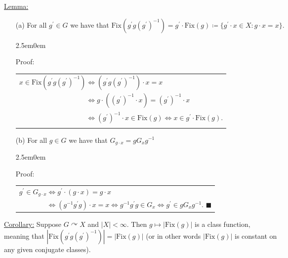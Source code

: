\documentclass{book}
\newcommand{\exTwo}{%
   \color{Purple}%
   \fontsize{13}{15}\selectfont%
}
\newcommand{\exThreeP}{%
   \color{RedViolet}%
   \fontsize{12}{14}\selectfont%
}
\newenvironment{myIndent}{%
   \begin{adjustwidth}{2.5em}{0em}%
}{%
   \end{adjustwidth}%
}
\newcommand{\Fix}{\mathrm{Fix}}
\newcommand{\retTwo}{\hfill\bigbreak}
\begin{document}
\setul{0.14em}{0.07em}
\calibri

\exTwo\ul{Lemma:}\\ [-20pt]
\begin{itemize}
	\item[(a)] For all $g^\prime \in G$ we have that $\Fix(g^\prime g (g^\prime)^{-1}) = g^\prime \cdot \Fix(g) \coloneqq \{g^\prime \cdot x \in X : g \cdot x = x\}$.
	
	\begin{myIndent}\exThreeP
		Proof:
		
		{\centering\begin{tabular}{l}
			$x \in \Fix(g^\prime g (g^\prime)^{-1}) \Longleftrightarrow (g^\prime g (g^\prime)^{-1}) \cdot x = x$\\ [3pt]
			$\phantom{x \in \Fix(g^\prime g (g^\prime)^{-1})} \Longleftrightarrow g \cdot ((g^\prime)^{-1} \cdot x) = (g^\prime)^{-1} \cdot x$\\ [3pt]
			$\phantom{x \in \Fix(g^\prime g (g^\prime)^{-1})} \Longleftrightarrow (g^\prime)^{-1} \cdot x \in \Fix(g) \Longleftrightarrow x \in g^\prime \cdot \Fix(g)$.
		\end{tabular} \retTwo\par}
	\end{myIndent}

	\item[(b)] For all $g \in G$ we have that $G_{g \cdot x} = gG_xg^{-1}$
	
	\begin{myIndent}\exThreeP
		Proof:

		{\centering\begin{tabular}{l}
			$g^\prime \in G_{g \cdot x} \Longleftrightarrow g^\prime \cdot (g \cdot x) = g \cdot x$\\ [3pt]
			$\phantom{g^\prime \in G_{g \cdot x}} \Longleftrightarrow (g^{-1}g^\prime g) \cdot x = x \Longleftrightarrow g^{-1}g^\prime g \in G_x \Longleftrightarrow g^\prime \in gG_xg^{-1}$. $\blacksquare$
		\end{tabular}\retTwo\par}
	\end{myIndent}
\end{itemize}

\ul{Corollary:} Suppose $G \curvearrowright X$ and $|X| < \infty$. Then $g \mapsto |\Fix(g)|$ is a class function,\\ meaning that $|\Fix(g^\prime g (g^\prime)^{-1})| = |\Fix(g)|$ (or in other words $|\Fix(g)|$ is constant on\\ any given conjugate classes).
\end{document}
